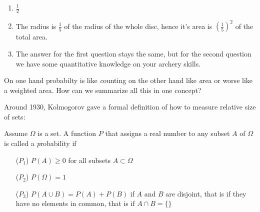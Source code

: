 \documentclass[twoside,11pt,a4paper]{article}
\newif\ifEN \ENtrue	                %
\def\tr|#1|#2|{\ifEN #2\else #1\fi}     %
\newenvironment{ttile}[1]{\begin{tcolorbox}[colback=tile,sharp corners,title=#1]}{\end{tcolorbox}}
\theoremstyle{definition}
\def\aside#1{\marginpar{\scriptsize #1}}
\begin{document}
\begin{Answer}
  \begin{enumerate}
  \item $\frac12$ 
  \item 
    \tr|Der Radius des gelben Teils ist $\frac 15$ des Radius' der ganzen Scheibe, also ist seine
        Fläche $\left(\frac15\right)^2$ der ganzen Fläche. 
       |The radius is $\frac15$ of the radius of the whole disc, hence it's area is $\left(\frac15\right)^2$ of the total area. |
  \item
   \tr|Die Antwort auf die erste Frage bleibt gleich, aber für die zweite Frage müssten wir genauer wissen, wie gut Sie treffen.  
      |The answer for the first question stays the same, but for the second question we have some quantitative knowledge on your archery skills. |
  \end{enumerate}
\end{Answer}
\tr|Einerseits lassen sich Wahrscheinlichkeiten durch Zählen berechnen, andrerseits auch durch eine Art \emph{Flächenberechnung}. Wie lässt sich all dies in einem Konzept behandeln?
|On one hand probabilty is like \emph{counting}  on the other hand like \emph{area} or worse like a weighted area. 
How can we summarize all this in one concept?|

\tr|Etwa im Jahr 1930 gab Kolmogorov ein solches Konzept an:
|Around 1930, Kolmogorov gave a formal definition of how to measure relative size of sets: |

\begin{ttile}{\tr|Wahrscheinlichkeits-Axiome|Axioms of probability|}
  \tr|Sei $\Omega$ eine Menge. Eine Funktion $P$, die jeder Teilmenge $A$ von $\Omega$ eine reelle Zahl zuordnet heisst
  \emph{Wahrscheinlichkeit}, falls gilt:
  |Assume $\Omega$ is a set.
  A function $P$ that assigns a real number to any subset $A$ of $\Omega$  is called a \emph{probability} if|
  \begin{itemize}
  \item[($P_1$)] $P(A)\geq 0$   \tr|f"ur alle Teilmengen |for all subsets $A\subset \Omega$|
  \item[($P_2$)] $P(\Omega)=1$ 
  \item[($P_3$)] $P(A\cup B)=P(A)+P(B)$ 
    \tr|wenn $A$ und $B$ disjunkt sind, d. h. falls sie keine Elemente gemeinsam haben: $A\cap B=\{\}$ 
    |if $A$ and $B$ are disjoint, that is if they have no elements in common, that is if $A\cap B=\{\}$| 
  \end{itemize}
\end{ttile}
\end{document}
